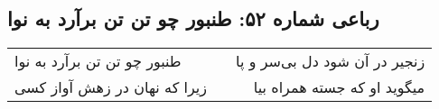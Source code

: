 \begin{center}
\section*{رباعی شماره ۵۲: طنبور چو تن تن برآرد به نوا}
\label{sec:0052}
\begin{longtable}{l p{0.5cm} r}
طنبور چو تن تن برآرد به نوا
&&
زنجیر در آن شود دل بی‌سر و پا
\\
زیرا که نهان در زهش آواز کسی
&&
میگوید او که جسته همراه بیا
\\
\end{longtable}
\end{center}
